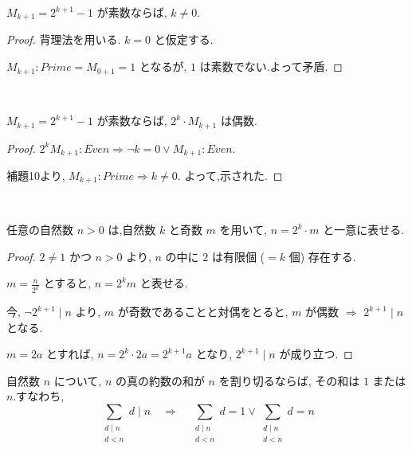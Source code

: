 \begin{lemma}\label{ne_zero_of_prime_mersenne}\leanok

\(M_{k+1} = 2^{k+1} - 1\) が素数ならば, \(k \neq 0\).

\end{lemma}

\begin{proof}
背理法を用いる. \(k = 0\) と仮定する.

\(M_{k+1} : Prime = M_{0+1} = 1\) となるが, \(1\) は素数でない.よって矛盾.
\end{proof}


\begin{theorem}\label{even_two_pow_mul_mersenne_of_prime}
\leanok~\

\(M_{k+1} = 2^{k+1} - 1\) が素数ならば, \(2^k \cdot M_{k+1}\) は偶数.

\end{theorem}

\begin{proof}
\(2^kM_{k+1} : Even \Rightarrow \lnot k = 0 \vee M_{k+1} : Even\).

補題10より, \(M_{k+1} : Prime \Rightarrow k \neq 0\). よって,示された.
\end{proof}


\begin{lemma}\label{eq_two_pow_mul_odd}\leanok~\

任意の自然数 \(n > 0\) は,自然数 \(k\) と奇数 \(m\) を用いて, \(n = 2^k \cdot m\) と一意に表せる.

\end{lemma}

\begin{proof}
\(2 \neq 1\) かつ \(n > 0\) より, \(n\) の中に \(2\) は有限個 (\(= k\) 個) 存在する.

\(m = \frac{n}{2^k}\) とすると, \(n = 2^km\) と表せる.

今, \(\lnot 2^{k+1} \mid n\) より, \(m\) が奇数であることと対偶をとると,
\(m\) が偶数 \(\Rightarrow\) \(2^{k+1} \mid n\) となる.

\(m = 2a\) とすれば, \(n = 2^k \cdot 2a = 2^{k+1}a\) となり, \(2^{k+1} \mid n\) が成り立つ.
\end{proof}

\begin{lemma}\label{sum_properDivisors_dvd}
\leanok

自然数 \(n\) について, \(n\) の真の約数の和が \(n\) を割り切るならば, その和は \(1\) または \(n\).すなわち,
\[
\sum_{\substack{d \mid n\\ d < n}} d \mid n \quad \Rightarrow \quad \sum_{\substack{d \mid n\\ d < n}} d = 1 \vee \sum_{\substack{d \mid n\\ d < n}} d = n
\]

\end{lemma}

